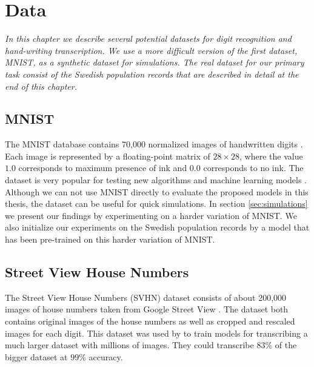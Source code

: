 \chapter{Data}

\textit{In this chapter we describe several potential datasets for digit recognition and hand-writing transcription. We use a more difficult version of the first dataset, MNIST, as a synthetic dataset for simulations. The real dataset for our primary task consist of the Swedish population records that are described in detail at the end of this chapter.}


\section{MNIST}

The MNIST database contains 70,000 normalized images of handwritten digits \cite{MNIST_orig}.
Each image is represented by a floating-point matrix of $28 \times 28$, where the value $1.0$ corresponds to maximum presence of ink and $0.0$ corresponds to no ink.
The dataset is very popular for testing new algorithms and machine learning models \cite{MNIST}.
Although we can not use MNIST directly to evaluate the proposed models in this thesis, the dataset can be useful for quick simulations.
In section \ref{sec:simulations} we present our findings by experimenting on a harder variation of MNIST.
We also initialize our experiments on the Swedish population records by a model that has been pre-trained on this harder variation of MNIST.

\section{Street View House Numbers}

The Street View House Numbers (SVHN) dataset consists of about 200,000 images of house numbers taken from Google Street View \cite{SVHN}. The dataset both contains original images of the house numbers as well as cropped and rescaled images for each digit. This dataset was used by \textcite{multidigit_streetview} to train models for transcribing a much larger dataset with millions of images. They could transcribe $83\%$ of the bigger dataset at $99\%$ accuracy.

